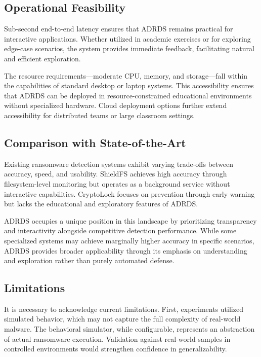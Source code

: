 \subsection{Operational Feasibility}

Sub-second end-to-end latency ensures that ADRDS remains practical for interactive applications. Whether utilized in academic exercises or for exploring edge-case scenarios, the system provides immediate feedback, facilitating natural and efficient exploration.

The resource requirements—moderate CPU, memory, and storage—fall within the capabilities of standard desktop or laptop systems. This accessibility ensures that ADRDS can be deployed in resource-constrained educational environments without specialized hardware. Cloud deployment options further extend accessibility for distributed teams or large classroom settings.

\subsection{Comparison with State-of-the-Art}

Existing ransomware detection systems exhibit varying trade-offs between accuracy, speed, and usability. ShieldFS \cite{continella2016shieldfs} achieves high accuracy through filesystem-level monitoring but operates as a background service without interactive capabilities. CryptoLock \cite{scaife2016cryptolock} focuses on prevention through early warning but lacks the educational and exploratory features of ADRDS.

ADRDS occupies a unique position in this landscape by prioritizing transparency and interactivity alongside competitive detection performance. While some specialized systems may achieve marginally higher accuracy in specific scenarios, ADRDS provides broader applicability through its emphasis on understanding and exploration rather than purely automated defense.

\subsection{Limitations}

It is necessary to acknowledge current limitations. First, experiments utilized simulated behavior, which may not capture the full complexity of real-world malware. The behavioral simulator, while configurable, represents an abstraction of actual ransomware execution. Validation against real-world samples in controlled environments would strengthen confidence in generalizability.

